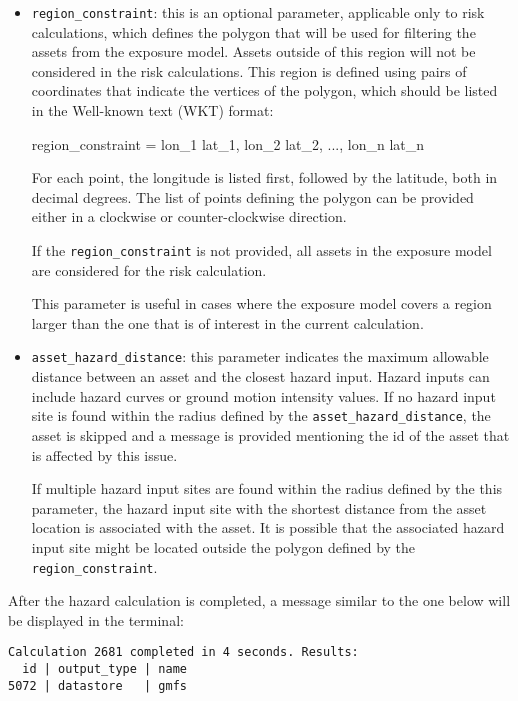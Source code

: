 \begin{itemize}

  \item \Verb+region_constraint+: this is an optional parameter, applicable
    only to risk calculations, which defines the polygon that will be used for
    filtering the assets from the exposure model. Assets outside of this region
    will not be considered in the risk calculations. This region is defined
    using pairs of coordinates that indicate the vertices of the polygon, which
    should be listed in the Well-known text (WKT) format:

    region\_constraint = lon\_1 lat\_1, lon\_2 lat\_2, ..., lon\_n lat\_n

    For each point, the longitude is listed first, followed by the latitude,
    both in decimal degrees. The list of points defining the polygon can be
    provided either in a clockwise or counter-clockwise direction.

    If the \Verb+region_constraint+ is not provided, all assets in the exposure
    model are considered for the risk calculation.

    This parameter is useful in cases where the exposure model covers a region
    larger than the one that is of interest in the current calculation.

  \item \Verb+asset_hazard_distance+: this parameter indicates the maximum
    allowable distance between an \gls{asset} and the closest hazard input.
    Hazard inputs can include hazard curves or ground motion intensity values.
    If no hazard input site is found within the radius defined by the
    \Verb+asset_hazard_distance+, the asset is skipped and a message is
    provided mentioning the id of the asset that is affected by this issue.

    If multiple hazard input sites are found within the radius defined by the
    this parameter, the hazard input site with the shortest distance from the
    asset location is associated with the asset. It is possible that the
    associated hazard input site might be located outside the polygon defined
    by the \Verb+region_constraint+.

\end{itemize}

After the hazard calculation is completed, a message similar to the one below
will be displayed in the terminal:

\begin{verbatim}
Calculation 2681 completed in 4 seconds. Results:
  id | output_type | name
5072 | datastore   | gmfs
\end{verbatim}

